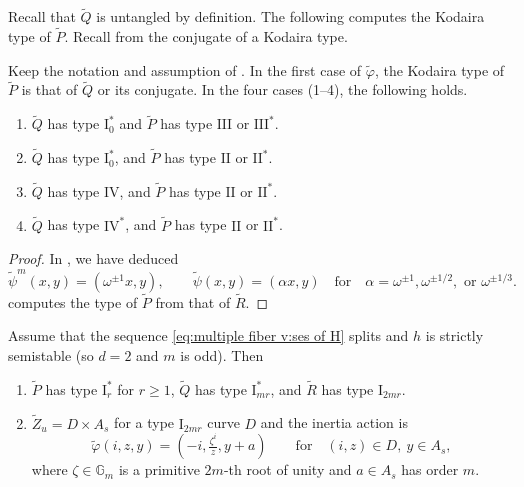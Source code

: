 \documentclass[reqno, letterpaper]{amsart}
\numberwithin{equation}{subsection}
\newcommand{\GG}{\mathbb{G}}
\begin{document}
		Recall that $\tilde Q$ is untangled by definition. The following computes the Kodaira type of $\tilde P$. Recall from  the conjugate of a Kodaira type.
		
		\begin{lemma} \label{lem:multiple fiber v:Kodaira type of P}
			Keep the notation and assumption of . In the first case of $\tilde \varphi$, the Kodaira type of $\tilde P$ is that of $\tilde Q$ or its conjugate. In the four cases (1--4), the following holds.
			\begin{enumerate}
				\item $\tilde Q$ has type $\mathrm I_0^*$ and $\tilde P$ has type $\mathrm{III}$ or $\mathrm{III}^*$.
				\item $\tilde Q$ has type $\mathrm I_0^*$, and $\tilde P$ has type $\mathrm{II}$ or $\mathrm{II}^*$.
				\item $\tilde Q$ has type $\mathrm{IV}$, and $\tilde P$ has type $\mathrm{II}$ or $\mathrm{II}^*$.
				\item $\tilde Q$ has type $\mathrm{IV}^*$, and $\tilde P$ has type $\mathrm{II}$ or $\mathrm{II}^*$.
			\end{enumerate}
		\end{lemma}
		\begin{proof}
			In , we have deduced
			\[ \tilde \psi^m (x,y) = (\omega^{\pm1} x, y) ,\qquad \tilde \psi (x,y) = (\alpha x, y) \quad\mbox{for}\quad \alpha = \omega^{\pm1}, \omega^{\pm1/2}, \mbox{ or } \omega^{\pm1/3} .\]
			 computes the type of $\tilde P$ from that of $\tilde R$.
		\end{proof}
		
		\begin{lemma} \label{lem:multiple fiber v:varphi-action strictly semistable}
			Assume that the sequence \eqref{eq:multiple fiber v:ses of H} splits and $h$ is strictly semistable (so $d = 2$ and $m$ is odd). Then
			\begin{enumerate}
				\item $\tilde P$ has type $\mathrm I_r^*$ for $r \ge 1$, $\tilde Q$ has type $\mathrm I_{mr}^*$, and $\tilde R$ has type $\mathrm I_{2mr}$.
				\item $\tilde Z_u = D \times A_s$ for a type $\mathrm I_{2mr}$ curve $D$ and the inertia action is
				\[ \tilde \varphi(i,z,y) = (-i, \tfrac{\zeta^i}{z}, y + a) \qquad\mbox{for}\quad (i, z) \in D, \ y \in A_s ,\]
				where $\zeta \in \GG_m$ is a primitive $2m$-th root of unity and $a \in A_s$ has order $m$.
			\end{enumerate}
		\end{lemma}
		
\end{document}
